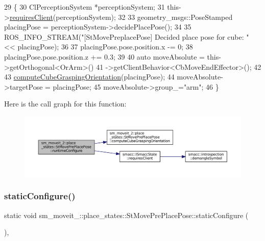 \begin{DoxyCode}
29     \{
30         ClPerceptionSystem *perceptionSystem;
31         this->\hyperlink{classsmacc_1_1ISmaccState_a7f95c9f0a6ea2d6f18d1aec0519de4ac}{requiresClient}(perceptionSystem);
32 
33         geometry\_msgs::PoseStamped placingPose = perceptionSystem->decidePlacePose();
34 
35         ROS\_INFO\_STREAM(\textcolor{stringliteral}{"[StMovePreplacePose] Decided place pose for cube: "} << placingPose);
36 
37         placingPose.pose.position.x -= 0;
38         placingPose.pose.position.z += 0.3;
39 
40         \textcolor{keyword}{auto} moveAbsolute = this->getOrthogonal<OrArm>()
41                                 ->getClientBehavior<CbMoveEndEffector>();
42 
43         \hyperlink{structsm__moveit__2_1_1place__states_1_1StMovePrePlacePose_a658e433e60208f64abc8d900b02d46a8}{computeCubeGraspingOrientation}(placingPose);
44         moveAbsolute->targetPose = placingPose;
45         moveAbsolute->group\_=\textcolor{stringliteral}{"arm"};
46     \}
\end{DoxyCode}
Here is the call graph for this function\+:
\nopagebreak
\begin{figure}[H]
\begin{center}
\leavevmode
\includegraphics[width=350pt]{structsm__moveit__2_1_1place__states_1_1StMovePrePlacePose_a8d9a228803a92b3129d84f63f6118692_cgraph}
\end{center}
\end{figure}
\mbox{\label{structsm__moveit__2_1_1place__states_1_1StMovePrePlacePose_a411aa0f59517aea85d6d0db585c4c2a7}} 
\subsubsection{\texorpdfstring{static\+Configure()}{staticConfigure()}}
{\footnotesize\ttfamily static void sm\+\_\+moveit\+\_\+::place\+\_\+states\+::\+St\+Move\+Pre\+Place\+Pose\+::static\+Configure (\begin{DoxyParamCaption}{ }\end{DoxyParamCaption})\hspace{0.3cm}{\ttfamily [inline]}, {\ttfamily [static]}}



